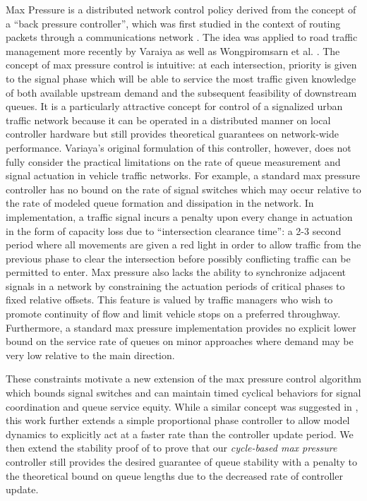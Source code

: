 Max Pressure is a distributed network control policy derived from the concept of a ``back pressure controller'', which was first studied in the context of routing packets through a communications network \cite{Tassiulas1992}. The idea was applied to road traffic management more recently by Varaiya \cite{Varaiya2013} as well as Wongpiromsarn et al. \cite{Wongpiromsarn2012}. The concept of max pressure control is intuitive: at each intersection, priority is given to the signal phase which will be able to service the most traffic given knowledge of both available upstream demand and the subsequent feasibility of downstream queues. It is a particularly attractive concept for control of a signalized urban traffic network because it can be operated in a distributed manner on local controller hardware but still provides theoretical guarantees on network-wide performance. Variaya's original formulation of this controller, however, does not fully consider the practical limitations on the rate of queue measurement and signal actuation in vehicle traffic networks. For example, a standard max pressure controller has no bound on the rate of signal switches which may occur relative to the rate of modeled queue formation and dissipation in the network. In implementation, a traffic signal incurs a penalty upon every change in actuation in the form of capacity loss due to ``intersection clearance time'': a 2-3 second period where all movements are given a red light in order to allow traffic from the previous phase to clear the intersection before possibly conflicting traffic can be permitted to enter. Max pressure also lacks the ability to synchronize adjacent signals in a network by constraining the actuation periods of critical phases to fixed relative offsets. This feature is valued by traffic managers who wish to promote continuity of flow and limit vehicle stops on a preferred throughway. Furthermore, a standard max pressure implementation provides no explicit lower bound on the service rate of queues on minor approaches where demand may be very low relative to the main direction. 

 
These constraints motivate a new extension of the max pressure control algorithm which bounds signal switches and can maintain timed cyclical behaviors for signal coordination and queue service equity. While a similar concept was suggested in \cite{Varaiya2013}, this work further extends a simple proportional phase controller to allow model dynamics to explicitly act at a faster rate than the controller update period. We then extend the stability proof of \cite{Varaiya2013} to prove that our \emph{cycle-based max pressure} controller still provides the desired guarantee of queue stability with a penalty to the theoretical bound on queue lengths due to the decreased rate of controller update.

